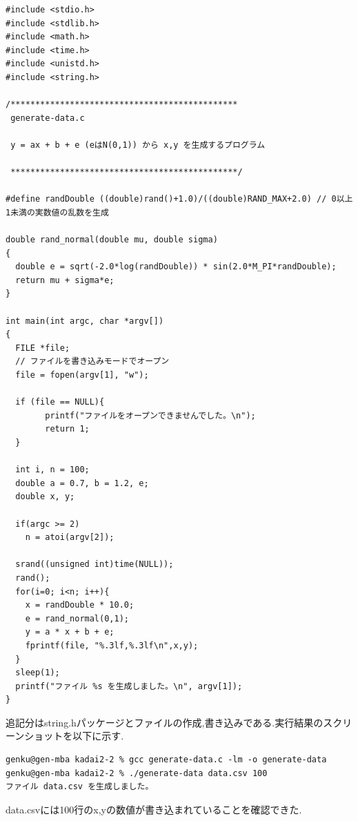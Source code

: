 \documentclass[a4j,10pt,dvipdfmx]{jarticle}
\begin{document}
\begin{lstlisting}[label=prm3, caption=generate-data.c]
#include <stdio.h>
#include <stdlib.h>
#include <math.h>
#include <time.h>
#include <unistd.h>
#include <string.h>

/**********************************************
 generate-data.c
 
 y = ax + b + e (eはN(0,1)) から x,y を生成するプログラム

 **********************************************/

#define randDouble ((double)rand()+1.0)/((double)RAND_MAX+2.0) // 0以上1未満の実数値の乱数を生成

double rand_normal(double mu, double sigma)
{
  double e = sqrt(-2.0*log(randDouble)) * sin(2.0*M_PI*randDouble);
  return mu + sigma*e;
}

int main(int argc, char *argv[])
{
  FILE *file;
  // ファイルを書き込みモードでオープン
  file = fopen(argv[1], "w");
  
  if (file == NULL){
        printf("ファイルをオープンできませんでした。\n");
        return 1;
  }

  int i, n = 100;
  double a = 0.7, b = 1.2, e;
  double x, y;

  if(argc >= 2)
    n = atoi(argv[2]);

  srand((unsigned int)time(NULL));
  rand();
  for(i=0; i<n; i++){
    x = randDouble * 10.0;
    e = rand_normal(0,1);
    y = a * x + b + e;
    fprintf(file, "%.3lf,%.3lf\n",x,y);
  }
  sleep(1);
  printf("ファイル %s を生成しました。\n", argv[1]);
}

\end{lstlisting}

追記分はstring.hパッケージとファイルの作成,書き込みである.実行結果のスクリーンショットを以下に示す.
\begin{verbatim}
genku@gen-mba kadai2-2 % gcc generate-data.c -lm -o generate-data  
genku@gen-mba kadai2-2 % ./generate-data data.csv 100            
ファイル data.csv を生成しました。
\end{verbatim}

data.csvには100行のx,yの数値が書き込まれていることを確認できた.
\end{document}
